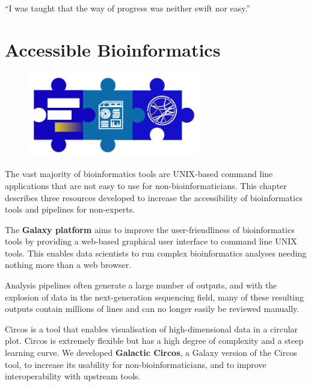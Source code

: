 \cleartorightpage\begin{savequote}[75mm]
``I was taught that the way of progress was neither swift nor easy.''
\end{savequote}

\chapter{Accessible Bioinformatics}\label{chapter:general}
\setcounter{figure}{-1}
\setcounter{table}{-1}
\setcounter{section}{-1}
\setcounter{NAT@ctr}{-1}

\begin{figure}[t!]
\includegraphics[height=10em]{frontmatter/images/chapter-header-technical.png}
\end{figure}
\setcounter{figure}{-1}
\setcounter{table}{-1}
\setcounter{section}{-1}

The vast majority of bioinformatics tools are UNIX-based command line applications that are not easy to use for non-bioinformaticians. This chapter describes three resources developed to increase the accessibility of bioinformatics tools and pipelines for non-experts.

The \textbf{Galaxy platform} aims to improve the user-friendliness of bioinformatics tools by providing a web-based graphical user interface to command line UNIX tools. This enables data scientists to run complex bioinformatics analyses needing nothing more than a web browser.

Analysis pipelines often generate a large number of outputs, and with the explosion of data in the next-generation sequencing field, many of these resulting outputs contain millions of lines and can no longer easily be reviewed manually.

Circos is a tool that enables visualisation of high-dimensional data in a circular plot. Circos is extremely flexible but has a high degree of complexity and a steep learning curve. We developed \textbf{Galactic Circos}, a Galaxy version of the Circos tool, to increase its usability for non-bioinformaticians, and to improve interoperability with upstream tools.

